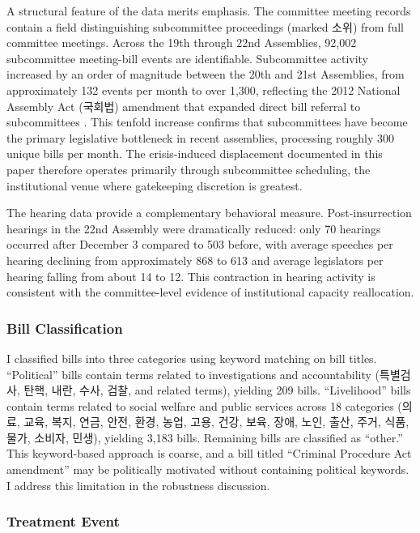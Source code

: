 \documentclass[11pt]{article}
\begin{document}
A structural feature of the data merits emphasis. The committee meeting records contain a field distinguishing subcommittee proceedings (marked 소위) from full committee meetings. Across the 19th through 22nd Assemblies, 92,002 subcommittee meeting-bill events are identifiable. Subcommittee activity increased by an order of magnitude between the 20th and 21st Assemblies, from approximately 132 events per month to over 1,300, reflecting the 2012 National Assembly Act (국회법) amendment that expanded direct bill referral to subcommittees \citep{parkpy2026}. This tenfold increase confirms that subcommittees have become the primary legislative bottleneck in recent assemblies, processing roughly 300 unique bills per month. The crisis-induced displacement documented in this paper therefore operates primarily through subcommittee scheduling, the institutional venue where gatekeeping discretion is greatest.

The hearing data provide a complementary behavioral measure. Post-insurrection hearings in the 22nd Assembly were dramatically reduced: only 70 hearings occurred after December 3 compared to 503 before, with average speeches per hearing declining from approximately 868 to 613 and average legislators per hearing falling from about 14 to 12. This contraction in hearing activity is consistent with the committee-level evidence of institutional capacity reallocation.

\subsubsection*{Bill Classification}

I classified bills into three categories using keyword matching on bill titles. ``Political'' bills contain terms related to investigations and accountability (특별검사, 탄핵, 내란, 수사, 검찰, and related terms), yielding 209 bills. ``Livelihood'' bills contain terms related to social welfare and public services across 18 categories (의료, 교육, 복지, 연금, 안전, 환경, 농업, 고용, 건강, 보육, 장애, 노인, 출산, 주거, 식품, 물가, 소비자, 민생), yielding 3,183 bills. Remaining bills are classified as ``other.'' This keyword-based approach is coarse, and a bill titled ``Criminal Procedure Act amendment'' may be politically motivated without containing political keywords. I address this limitation in the robustness discussion.

\subsubsection*{Treatment Event}
\end{document}
